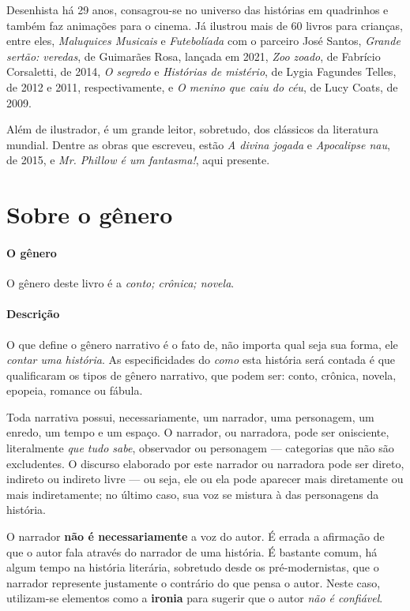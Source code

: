 \documentclass[11pt]{extarticle}
\begin{document}
Desenhista há 29 anos, consagrou-se no universo das histórias em quadrinhos e também faz animações para o cinema. 
Já ilustrou mais de 60 livros para crianças, entre eles, \textit{Maluquices Musicais} e \textit{Futebolíada} com o parceiro José Santos, \textit{Grande sertão: veredas}, de Guimarães Rosa, lançada em 2021,
\textit{Zoo zoado}, de Fabrício Corsaletti, de 2014, \textit{O segredo} e \textit{Histórias de mistério}, de Lygia Fagundes Telles, de 2012 e 2011, respectivamente, e \textit{O menino que caiu do céu}, de Lucy Coats, de 2009.

Além de ilustrador, é um grande leitor, sobretudo, dos clássicos da literatura mundial.
Dentre as obras que escreveu, estão \textit{A divina jogada} e \textit{Apocalipse nau}, de 2015, e \textit{Mr. Phillow é um fantasma!}, aqui presente.


\section{Sobre o gênero}

\paragraph{O gênero} O gênero deste livro é a \textit{conto; crônica; novela}. 

\paragraph{Descrição} O que define o gênero narrativo é o fato de, não importa
qual seja sua forma, ele \textit{contar uma história}.
As especificidades do \textit{como} esta história será contada é que
qualificaram os tipos de gênero narrativo, que podem ser: conto, crônica, novela,
epopeia, romance ou fábula. 

Toda narrativa possui, necessariamente, um narrador, uma personagem, um enredo,
um tempo e um espaço. O narrador, ou narradora, pode ser onisciente, literalmente
\textit{que tudo sabe}, observador ou personagem --- categorias que não são excludentes.
O discurso elaborado por este narrador ou narradora pode ser direto, indireto ou indireto livre 
--- ou seja, ele ou ela pode aparecer mais diretamente ou mais indiretamente; no último caso,
sua voz se mistura à das personagens da história.

O narrador \textbf{não é necessariamente} a voz do autor. É errada a afirmação
de que o autor fala através do narrador de uma história. É bastante comum,
há algum tempo na história literária, sobretudo desde os pré-modernistas, que 
o narrador represente justamente o contrário do que pensa o autor. Neste caso, 
utilizam-se elementos como a \textbf{ironia} para sugerir que o autor \textit{não é confiável}.
\end{document}
